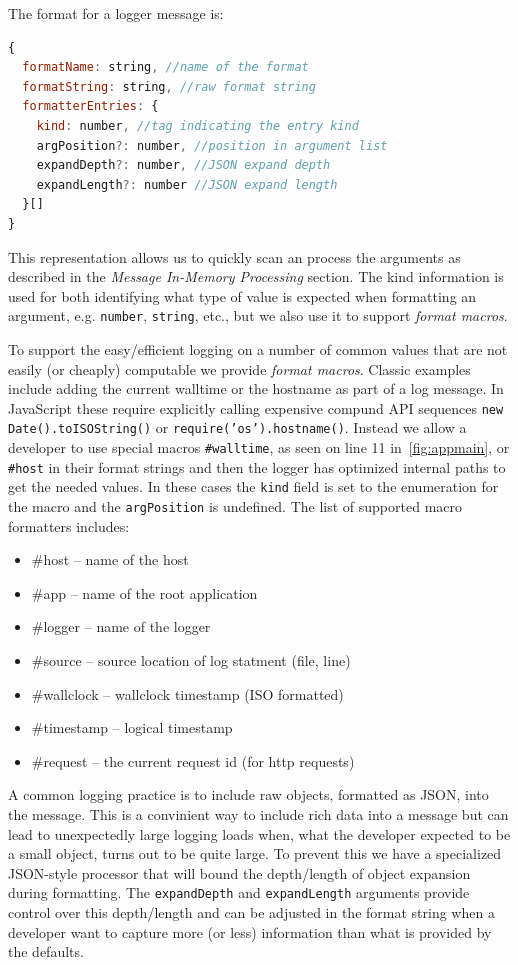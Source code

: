 The format for a logger message is:
\begin{lstlisting}[language=JavaScript,basicstyle=\scriptsize]
{
  formatName: string, //name of the format
  formatString: string, //raw format string
  formatterEntries: {
    kind: number, //tag indicating the entry kind
    argPosition?: number, //position in argument list
    expandDepth?: number, //JSON expand depth
    expandLength?: number //JSON expand length
  }[]
}
\end{lstlisting}

This representation allows us to quickly scan an process the arguments as 
described in the \emph{Message In-Memory Processing} section. The kind 
information is used for both identifying what type of value is expected 
when formatting an argument, e.g. \texttt{number}, \texttt{string}, etc., 
but we also use it to support \emph{format macros}.

To support the easy/efficient logging on a number of common values that 
are not easily (or cheaply) computable we provide \emph{format macros}. 
Classic examples include adding the current walltime or the hostname as 
part of a log message. In JavaScript these require explicitly calling 
expensive compund API sequences \texttt{new Date().toISOString()} or 
\texttt{require('os').hostname()}. Instead we allow a developer to use 
special macros \texttt{\#walltime}, as seen on line 11 in~\autoref{fig:appmain}, 
or \texttt{\#host} in their format 
strings and then the logger has optimized internal paths to get the needed 
values. In these cases the \texttt{kind} field is set to the enumeration 
for the macro and the \texttt{argPosition} is undefined. The list of supported 
macro formatters includes:
\begin{itemize}
  \item \#host -- name of the host
  \item \#app -- name of the root application
  \item \#logger -- name of the logger
  \item \#source -- source location of log statment (file, line)
  \item \#wallclock -- wallclock timestamp (ISO formatted)
  \item \#timestamp -- logical timestamp
  \item \#request   -- the current request id (for http requests)
\end{itemize}

A common logging practice is to include raw objects, formatted as JSON, into the 
message. This is a convinient way to include rich data into a message but can 
lead to unexpectedly large logging loads when, what the developer expected to 
be a small object, turns out to be quite large. To prevent this we have a specialized 
JSON-style processor that will bound the depth/length of object expansion during 
formatting. The \texttt{expandDepth} and \texttt{expandLength} arguments provide 
control over this depth/length and can be adjusted in the format string when a 
developer want to capture more (or less) information than what is provided by the 
defaults.

